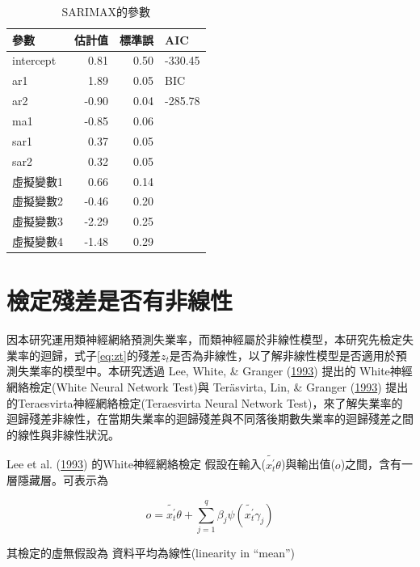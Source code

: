 \documentclass[oneside]{book}
\begin{document}
\begin{table}

\caption{\label{tab:SARIMAX}SARIMAX的參數}
\centering
\begin{tabular}[t]{l|r|r|l}
\hline
參數 & 估計值 & 標準誤 & AIC\\
\hline
intercept & 0.81 & 0.50 & -330.45\\
\hline
ar1 & 1.89 & 0.05 & BIC\\
\hline
ar2 & -0.90 & 0.04 & -285.78\\
\hline
ma1 & -0.85 & 0.06 & \\
\hline
sar1 & 0.37 & 0.05 & \\
\hline
sar2 & 0.32 & 0.05 & \\
\hline
虛擬變數1 & 0.66 & 0.14 & \\
\hline
虛擬變數2 & -0.46 & 0.20 & \\
\hline
虛擬變數3 & -2.29 & 0.25 & \\
\hline
虛擬變數4 & -1.48 & 0.29 & \\
\hline
\end{tabular}
\end{table}

\hypertarget{ux6aa2ux5b9aux6b98ux5deeux662fux5426ux6709ux975eux7ddaux6027}{%
\section{檢定殘差是否有非線性}\label{ux6aa2ux5b9aux6b98ux5deeux662fux5426ux6709ux975eux7ddaux6027}}

因本研究運用類神經網絡預測失業率，而類神經屬於非線性模型，本研究先檢定失業率的迴歸，式子\eqref{eq:zt}的殘差\(z_t\)是否為非線性，以了解非線性模型是否適用於預測失業率的模型中。本研究透過 Lee, White, \& Granger (\protect\hyperlink{ref-leeTestingNeglectedNonlinearity1993}{1993}) 提出的 White神經網絡檢定(White Neural Network Test)與 Teräsvirta, Lin, \& Granger (\protect\hyperlink{ref-terasvirtaPowerNeuralNetwork1993}{1993}) 提出的Teraesvirta神經網絡檢定(Teraesvirta Neural Network Test)，來了解失業率的迴歸殘差非線性，在當期失業率的迴歸殘差與不同落後期數失業率的迴歸殘差之間的線性與非線性狀況。

Lee et al. (\protect\hyperlink{ref-leeTestingNeglectedNonlinearity1993}{1993}) 的White神經網絡檢定
假設在輸入(\(\tilde{x^{'}_t}\theta\))與輸出值(\(o\))之間，含有一層隱藏層。可表示為

\[o=\tilde{x^{'}_t}\theta+\sum\limits^q_{j=1}\beta_j\psi(\tilde{x^{'}_t}\gamma_j)\]

其檢定的虛無假設為
資料平均為線性(linearity in ``mean'')
\end{document}
